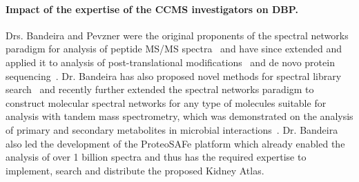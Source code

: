\documentclass[arial,11pt]{article}
\begin{document}
\paragraph{Impact of the expertise of the CCMS investigators on DBP.} Drs. Bandeira and Pevzner were the original proponents of the spectral networks paradigm for analysis of peptide MS/MS spectra~\cite{bandeira04,bandeira07pnas,guthals12specnets} and have since extended and applied it to analysis of post-translational modifications~\cite{gonzalez10,yang11} and de novo protein sequencing~\cite{bandeira07mcp,guthals12metasps}. Dr. Bandeira has also proposed novel methods for spectral library search~\cite{wang10} and recently further extended the spectral networks paradigm to construct molecular spectral networks for any type of molecules suitable for analysis with tandem mass spectrometry, which was demonstrated on the analysis of primary and secondary metabolites in microbial interactions~\cite{watrous12,moree12}. Dr. Bandeira also led the development of the ProteoSAFe platform which already enabled the analysis of over 1 billion spectra and thus has the required expertise to implement, search and distribute the proposed Kidney Atlas.


%


%


\end{document}
